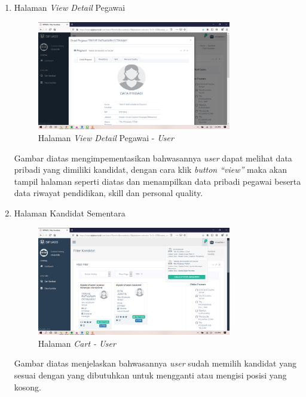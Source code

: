 \begin{enumerate}
	\item Halaman\textit{ View Detail} Pegawai
	\begin{figure}
		\centering
		\includegraphics[width=0.8\textwidth]
		{pics/user/implementasi/viewdetailpegawai.png}
		\caption{Halaman \textit{View Detail} Pegawai - \textit{User}}
		\label{fig:CC10}
	\end{figure}
	
	Gambar diatas mengimpementasikan bahwasannya \textit{user} dapat melihat data pribadi yang dimiliki kandidat, dengan cara klik\textit{ button “view”} maka akan tampil halaman seperti diatas dan menampilkan data pribadi pegawai beserta data riwayat pendidikan, skill dan personal quality.
	
	\newpage
	\item Halaman Kandidat Sementara
	\begin{figure}
		\centering
		\includegraphics[width=0.8\textwidth]
		{pics/user/implementasi/cartuser.png}
		\caption{Halaman \textit{Cart - User}}
		\label{fig:CC10}
	\end{figure}
	
	Gambar diatas menjelaskan bahwasannya \textit{user} sudah memilih kandidat yang sesuai dengan yang dibutuhkan untuk mengganti atau mengisi posisi yang kosong.  
	

\end{enumerate}
